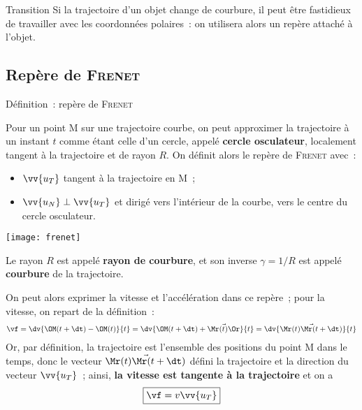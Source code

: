 \documentclass[../main/main.tex]{subfiles}
\begin{document}
\begin{instruc}[trans]{Transition}
	Si la trajectoire d'un objet change de courbure, il peut être fastidieux de
	travailler avec les coordonnées polaires~: on utilisera alors un repère
	attaché à l'objet.
\end{instruc}

\subsection{Repère de \textsc{Frenet}}

\begin{tdefi}{Définition~: repère de \textsc{Frenet}}
	\begin{minipage}{0.70\linewidth}
		Pour un point M sur une trajectoire courbe, on peut approximer la
		trajectoire à un instant $t$ comme étant celle d'un cercle, appelé
		\textbf{cercle osculateur}, localement tangent à la trajectoire et de rayon
		$R$. On définit alors le repère de \textsc{Frenet} avec~: \bigbreak
		\begin{itemize}
			\item $\vv{u_T}$ tangent à la trajectoire en M~;
			\item $\vv{u_N} \perp \vv{u_T}$ et dirigé vers l'intérieur de la
			      courbe, vers le centre du cercle osculateur.
		\end{itemize}
	\end{minipage}
	\hfill
	\begin{minipage}{0.25\linewidth}
		\begin{center}
			\texttt{[image: frenet]}
		\end{center}
	\end{minipage} \bigbreak
	Le rayon $R$ est appelé \textbf{rayon de courbure}, et son inverse $\gamma =
		1/R$ est appelé \textbf{courbure} de la trajectoire.
\end{tdefi}

On peut alors exprimer la vitesse et l'accélération dans ce repère~; pour la
vitesse, on repart de la définition~:
\begin{gather*}
	\vf
	= \dv{\OM(t+\dt)-\OM(t)}{t}
	= \dv{\OM(t+\dt)+\vec{\Mr(t)\Or}}{t}
	= \dv{\vec{\Mr(t)\Mr(t+\dt)}}{t}
\end{gather*}
Or, par définition, la trajectoire est l'ensemble des positions du point M dans
le temps, donc le vecteur $\vec{\Mr(t)\Mr(t+\dt)}$ défini la trajectoire et la
direction du vecteur $\vv{u_T}$~; ainsi, \textbf{la vitesse est tangente à la
	trajectoire} et on a
\[
	\boxed{\vf = v\vv{u_T}}
\]
\end{document}
